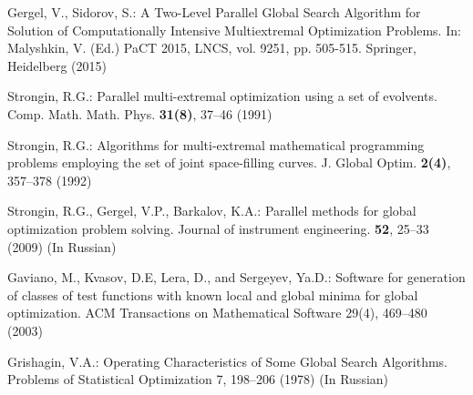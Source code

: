 \documentclass[runningheads]{llncs}
\begin{document}
\begin{thebibliography}{107}
Gergel, V., Sidorov, S.: A Two-Level Parallel Global Search Algorithm for Solution of Computationally Intensive Multiextremal Optimization Problems. In: Malyshkin, V. (Ed.) PaCT 2015, LNCS, vol. 9251, pp. 505-515. Springer, Heidelberg (2015)

Strongin, R.G.: Parallel multi-extremal optimization using a set of evolvents. Comp. Math. Math. Phys. \textbf{31(8)}, 37--46 (1991)

Strongin, R.G.: Algorithms for multi-extremal mathematical programming problems employing the set of joint space-filling curves. J. Global Optim. \textbf{2(4)}, 357--378 (1992)

Strongin, R.G., Gergel, V.P., Barkalov, K.A.: Parallel methods for global optimization problem solving. Journal of instrument engineering. \textbf{52}, 25--33 (2009) (In Russian)

Gaviano, M., Kvasov, D.E, Lera, D., and Sergeyev, Ya.D.: Software for generation of classes of test functions with known local and global minima for global optimization. ACM Transactions on Mathematical Software 29(4), 469--480 (2003)

Grishagin, V.A.: Operating Characteristics of Some Global Search Algorithms. Problems of Statistical Optimization 7, 198--206 (1978) (In Russian)

\end{thebibliography}
\end{document}
